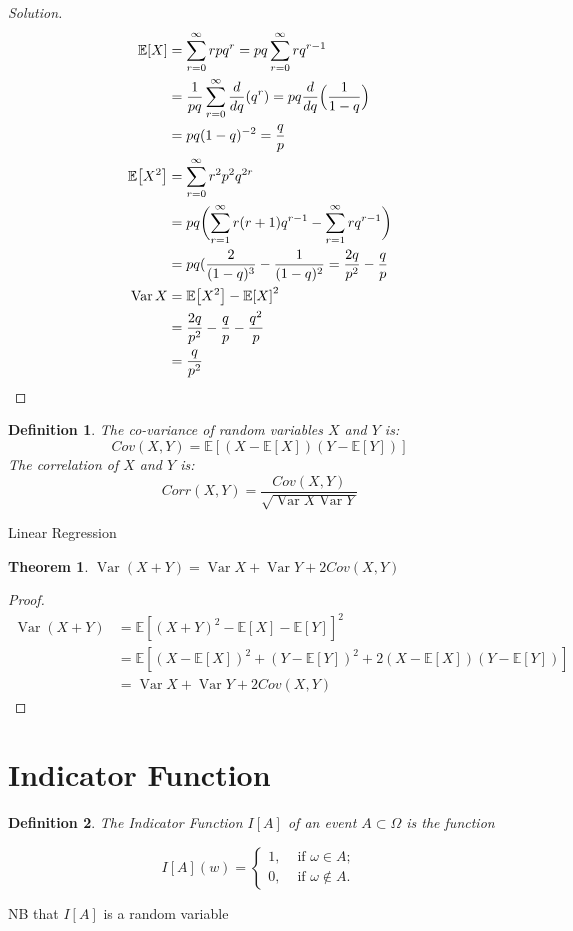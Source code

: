\documentclass{notes}
\theoremstyle{plain}
\newtheorem{theorem}{Theorem}[chapter]
\newtheorem{definition}{Definition}[chapter]
\newcommand{\bE}{\mathbb{E}}
\newcommand{\expect}[1]{\bE\!\left[#1\right]}
\DeclareMathOperator{\var}{Var}
\begin{document}
\begin{proof}[Solution]
\begin{align*}
\expect{X}& = \sum_{r=0}^\infty rpq^r 
= pq \sum_{r=0}^\infty rq^{r-1}\\
&= \frac{1}{pq}  \sum_{r=0}^\infty \frac{d}{dq} (q^r)
= pq  \frac{d}{dq} \Bigl(\frac{1}{1-q}\Bigl)\\
&= pq (1-q)^{-2} = \frac{q}{p}\\
\expect{X^2} &= \sum_{r=0}^\infty r^2p^2q^{2r}\\
&= pq \biggl(\sum_{r=1}^\infty r(r+1)q^{r-1} - \sum_{r=1}^\infty rq^{r-1}\biggl)\\
&= pq (\frac{2}{(1-q)^3} - \frac{1}{(1-q)^2}
= \frac{2q}{p^2} - \frac{q}{p}\\
\var{X} &= \expect{X^2}- {\expect{X}}^2\\
&= \frac{2q}{p^2} - \frac{q}{p} - \frac{q^2}{p}\\
&= \frac{q}{p^2}
\end{align*}
\end{proof}

\begin{definition}
The co-variance of random variables $X$ and $Y$ is:
\[
Cov(X,Y) = \expect{(X - \expect{X})(Y - \expect{Y})}
\]
The correlation of $X$ and $Y$ is:
\[
Corr(X,Y) = \frac{Cov(X,Y)}{\sqrt{\var{X}\var{Y}}}
\]
\end{definition}
Linear Regression
\begin{theorem}
$\var{(X+Y)} = \var{X} +\var{Y} + 2Cov(X,Y)$
\end{theorem}

\begin{proof}
\begin{align*}
\var{(X+Y)} &= \expect{(X+Y)^2 - \expect{X} - \expect{Y}}^2\\
& = \expect{(X- \expect{X})^2 
+(Y- \expect{Y})^2 +2 (X- \expect{X})(Y- \expect{Y})}\\
&= \var{X} +\var{Y} + 2Cov(X,Y)
\end{align*}
\end{proof}

\section{Indicator Function}
\begin{definition}
The Indicator Function $I[A]$ of an event $A \subset \Omega$ is the function

\begin{equation}
I[A](w) =  
\begin{cases}
1, &\text{ if $\omega \in A$};\\
0, &\text{ if $\omega \notin A$}.
\end{cases}
\end{equation}

\end{definition}
NB that $I[A]$ is a random variable
\end{document}
